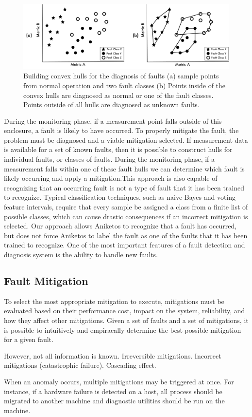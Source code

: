 \begin{figure}[tb]
  \centering
  \includegraphics[width=\columnwidth]{images/class_hulls}
  \caption{Building convex hulls for the diagnosis of faults (a) sample points from normal operation and two fault classes (b) Points inside of the convex hulls are diagnosed as normal or one of the fault classes. Points outside of all hulls are diagnosed as unknown faults.}
  \label{fig:class_hulls}
\end{figure}

During the monitoring phase, if a measurement point falls outside of this enclosure, a fault is likely to have occurred. To properly mitigate the fault, the problem must be diagnosed \cite{6100108} and a viable mitigation selected. If measurement data is available for a set of known faults, then it is possible to construct hulls for individual faults, or classes of faults. During the monitoring phase, if a measurement falls within one of these fault hulls we can determine which fault is likely occurring and apply a mitigation.This approach is also capable of recognizing that an occurring fault is not a type of fault that it has been trained to recognize. Typical classification techniques, such as naive Bayes and voting feature intervals\cite{Demiroz1997}, require that every sample be assigned a class from a finite list of possible classes, which can cause drastic consequences if an incorrect mitigation is selected. Our approach allows Aniketos to recognize that a fault has occurred, but does not force Aniketos to label the fault as one of the faults that it has been trained to recognize. One of the most important features of a fault detection and diagnosis system is the ability to handle new faults.

\subsection{Fault Mitigation}
\label{sub:fault_mitigation}
To select the most appropriate mitigation to execute, mitigations must be evaluated based on their performance cost, impact on the system, reliability, and how they affect other mitigations. Given a set of faults and a set of mitigations, it is possible to intuitively and empiracally determine the best possible mitigation for a given fault.

However, not all information is known. Irreversible mitigations. Incorrect mitigations (catastrophic failure). Cascading effect.

When an anomaly occurs, multiple mitigations may be triggered at once. For instance, if a  hardware failure is detected on a host, all process should be migrated to another machine and diagnostic utilities should be run on the machine.